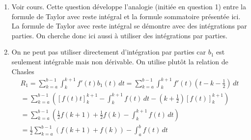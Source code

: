 \begin{enumerate}
  \item Voir cours. Cette question développe l'analogie (initiée en question 1) entre la formule de Taylor avec reste intégral et la formule sommatoire présentée ici. La formule de Taylor avec reste intégral se démontre avec des intégrations par parties. On cherche donc ici aussi à utiliser des intégrations par parties.

  \item On ne peut pas utiliser directement d'intégration par parties car $b_1$ est seulement intégrable mais non dérivable. On utilise plutôt la relation de Chasles
\begin{multline*}
R_1 = \sum_{k=a}^{b-1}\int_k^{k+1}f'(t)b_1(t)\,dt 
= \sum_{k=a}^{b-1}\int_k^{k+1}f'(t)\left( t-k-\frac{1}{2}\right) \,dt \\
= \sum_{k=a}^{b-1}\left( \left[f(t)t\right]_k^{k+1} -\int_k^{k+1}f(t)\,dt - (k+\frac{1}{2})\left[f(t)\right]_k^{k+1}  \right) \\
= \sum_{k=a}^{b-1}\left(\frac{1}{2}f(k+1) + \frac{1}{2}f(k) -\int_k^{k+1}f(t)\,dt \right) \\
= \frac{1}{2}\sum_{k=a}^{b-1}\left(f(k+1) + f(k)\right) - \int_a^{b}f(t)\,dt
\end{multline*}


\end{enumerate}
